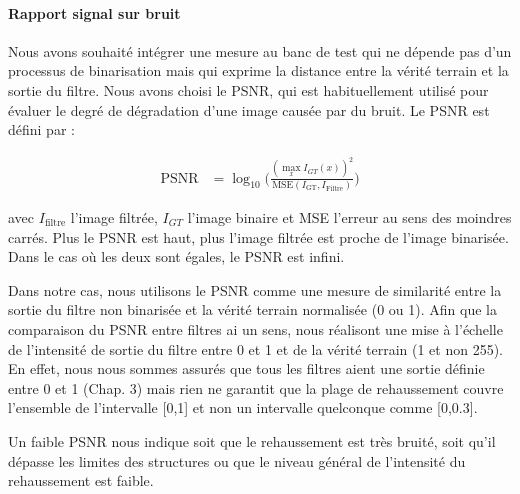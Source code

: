 \paragraph{Rapport signal sur bruit}


Nous avons souhaité intégrer une mesure au banc de test qui ne dépende pas d'un processus de binarisation mais qui exprime la distance entre la vérité terrain et la sortie du filtre. Nous avons choisi le PSNR, qui est habituellement utilisé pour évaluer le degré de dégradation d'une image causée par du bruit. Le PSNR est défini par :

\begin{align}%
 \nonumber
  \textrm{PSNR} & = \log_{10}\Big( \frac{ (\max_x I_{GT}(x))^2  }{ \textrm{MSE}( I_{\textrm{GT}}, I_{\textrm{Filtre}} ) } \Big)
\end{align}

avec $I_{\textrm{filtre}}$ l'image filtrée, $I_{GT}$ l'image binaire et MSE l'erreur au sens des moindres carrés. Plus le PSNR est haut, plus l'image filtrée est proche de l'image binarisée. Dans le cas où les deux sont égales, le PSNR est infini.

Dans notre cas, nous utilisons le PSNR comme une mesure de similarité entre la sortie du filtre non binarisée et la vérité terrain normalisée (0 ou 1). Afin que la comparaison du PSNR entre filtres ai un sens, nous réalisont une mise à l'échelle de l'intensité de sortie du filtre entre 0 et 1 et de la vérité terrain (1 et non 255). En effet, nous nous sommes assurés que tous les filtres aient une sortie définie entre 0 et 1 (Chap. 3) mais rien ne garantit que la plage de rehaussement couvre l'ensemble de l'intervalle [0,1] et non un intervalle quelconque comme [0,0.3].

Un faible PSNR nous indique soit que le rehaussement est très bruité, soit qu'il dépasse les limites des structures ou que le niveau général de l'intensité du rehaussement est faible.

